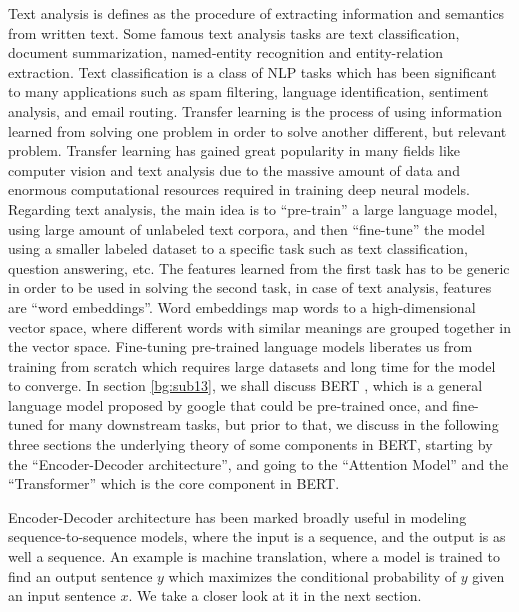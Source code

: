 Text analysis is defines as the procedure of extracting information and semantics from written text. Some famous text analysis tasks are text classification, document summarization, named-entity recognition and entity-relation extraction. 
Text classification is a class of \ac{NLP} tasks which has been significant to many applications such as spam filtering, language identification, sentiment analysis, and email routing. 
Transfer learning is the process of using information learned from solving one problem in order to solve another different, but relevant problem. 
Transfer learning has gained great popularity in many fields like computer vision and text analysis due to the massive amount of data and enormous computational resources required in training deep neural models. 
Regarding text analysis, the main idea is to \enquote{pre-train} a large language model, using large amount of unlabeled text corpora, and then \enquote{fine-tune} the model using a smaller labeled dataset to a specific task such as text classification, question answering, etc. 
The features learned from the first task has to be generic in order to be used in solving the second task, in case of text analysis, features are \enquote{word embeddings}. 
Word embeddings map words to a high-dimensional vector space, where different words with similar meanings are grouped together in the vector space. Fine-tuning pre-trained language models liberates us from training from scratch which requires large datasets and long time for the model to converge. 
In section \ref{bg:sub13}, we shall discuss \ac{BERT} \cite{devlin2018bert}, which is a general language model proposed by google that could be pre-trained once, and fine-tuned for many downstream tasks, but prior to that, we discuss in the following three sections the underlying theory of some components in \ac{BERT}, starting by the \enquote{Encoder-Decoder architecture}, and going to the \enquote{Attention Model} and the \enquote{Transformer} which is the core component in \ac{BERT}. 

Encoder-Decoder architecture has been marked broadly useful in modeling sequence-to-sequence models, where the input is a sequence, and the output is as well a sequence. An example is machine translation, where a model is trained to find an output sentence $y$ which maximizes the conditional probability of $y$ given an input sentence $x$. We take a closer look at it in the next section.


 

